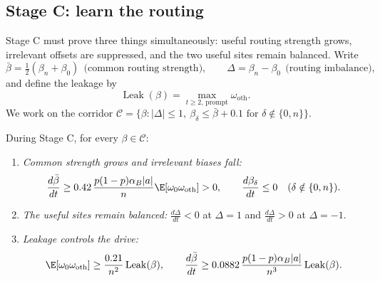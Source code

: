 \subsection{Stage C: learn the routing}
Stage C must prove three things simultaneously: useful routing strength grows, irrelevant offsets are suppressed,
and the two useful sites remain balanced. Write
\[
 \bar\beta=\tfrac12(\beta_n+\beta_0)\ \ \text{(common routing strength)},
 \qquad
 \Delta=\beta_n-\beta_0\ \ \text{(routing imbalance)},
\]
and define the leakage by
\[
 \operatorname{Leak}(\beta)=\max_{t\ge2,\,\mathrm{prompt}}\omega_{\mathrm{oth}}.
\]
We work on the corridor $\mathcal C=\{\beta:|\Delta|\le1,\ \beta_\delta\le\bar\beta+0.1\text{ for }\delta\notin\{0,n\}\}$.

\begin{lemma}
\label{lem:R-field}
During Stage C, for every $\beta\in\mathcal C$:
\begin{enumerate}[label=(\alph*),leftmargin=*,itemsep=3pt,topsep=2pt]
\item \emph{Common strength grows and irrelevant biases fall:}
\[
 \frac{d\bar\beta}{dt}\ge0.42\,\frac{p(1-p)\alpha_B|a|}{n}\E[\omega_0\omega_{\mathrm{oth}}]>0,
 \qquad \frac{d\beta_\delta}{dt}\le0\quad(\delta\notin\{0,n\}).
\]
\item \emph{The useful sites remain balanced:} $\tfrac{d\Delta}{dt}<0$ at $\Delta=1$ and $\tfrac{d\Delta}{dt}>0$ at $\Delta=-1$.
\item \emph{Leakage controls the drive:}
\[
 \E[\omega_0\omega_{\mathrm{oth}}]\ge\frac{0.21}{n^2}\operatorname{Leak}(\beta),
 \qquad
 \frac{d\bar\beta}{dt}\ge0.0882\,\frac{p(1-p)\alpha_B|a|}{n^3}\operatorname{Leak}(\beta).
\]
\end{enumerate}
\end{lemma}

